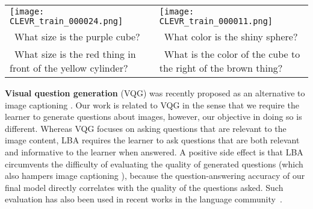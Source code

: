 \documentclass[10pt,twocolumn,letterpaper]{article}
\newcommand{\redxmark}{{\color{red}\textbf{\ding{55}}}}
\begin{document}
\begin{table}[!t]
\footnotesize{
    \centering
    \begin{tabular}{@{}p{}p{}@{}}
    \texttt{[image: CLEVR\_train\_000024.png]}  
         & \texttt{[image: CLEVR\_train\_000011.png]} \\
                                \vspace{-0.1in}
        \redxmark\ What size is the purple cube? & \vspace{-0.1in} \redxmark\ What color is the shiny sphere? \\
        \vspace{-0.1in}
        \redxmark\ What size is the red thing in front of the yellow cylinder? & \vspace{-0.1in} \redxmark\ What is the color of the cube to the right of the brown thing? \\
    \end{tabular}
    \vspace{-0.05in}
    \vspace{-0.2in}
    \label{fig:invalid_q_examples}
}
\end{table}

\textbf{Visual question generation} (VQG) was recently proposed as an alternative to image captioning \citep{mostafazadeh16vqg,liu17ivqa,rothe2017question}. Our work is related to VQG in the sense that we require the learner to generate questions about images, however, our objective in doing so is different. Whereas VQG focuses on asking questions that are relevant to the image content, LBA requires the learner to ask questions that are both relevant and informative to the learner when answered. A positive side effect is that LBA circumvents the difficulty of evaluating the quality of generated questions (which also hampers image captioning \citep{anderson16spice}), because the question-answering accuracy of our final model directly correlates with the quality of the questions asked. Such evaluation has also been used in recent works in the language community~\cite{wang2017joint,yang2017semi}.
\end{document}
